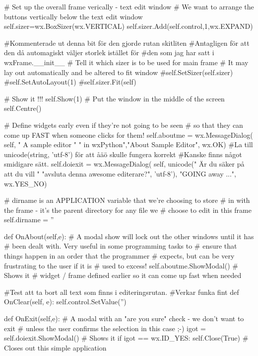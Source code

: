         # Set up the overall frame verically - text edit window
        # We want to arrange the buttons vertically below the text edit window
        self.sizer=wx.BoxSizer(wx.VERTICAL)
        self.sizer.Add(self.control,1,wx.EXPAND)

        #Kommenterade ut denna bit för den gjorde rutan skitliten
        #Antagligen för att den då automagiskt väljer storlek istället för
        #den som jag har satt i wxFrame.__init__
        # Tell it which sizer is to be used for main frame
        # It may lay out automatically and be altered to fit window
        #self.SetSizer(self.sizer)
        #self.SetAutoLayout(1)
        #self.sizer.Fit(self)

        # Show it !!!
        self.Show(1)
        # Put the window in the middle of the screen
        self.Centre()

        # Define widgets early even if they're not going to be seen
        # so that they can come up FAST when someone clicks for them!
        self.aboutme = wx.MessageDialog( self, " A sample editor \n"
                            " in wxPython","About Sample Editor", wx.OK)
        #La till unicode(string, 'utf-8') för att åäö skulle fungera korrekt
        #Kanske finns något smidigare sätt.
        self.doiexit = wx.MessageDialog( self, unicode(" Är du säker på att du vill \n"
                                         "avsluta denna awesome editerare?", 'utf-8'),
                        "GOING away ...", wx.YES_NO)

        # dirname is an APPLICATION variable that we're choosing to store
        # in with the frame - it's the parent directory for any file we
        # choose to edit in this frame
        self.dirname = ''

    def OnAbout(self,e):
        # A modal show will lock out the other windows until it has
        # been dealt with. Very useful in some programming tasks to
        # ensure that things happen in an order that  the programmer
        # expects, but can be very frustrating to the user if it is
        # used to excess!
        self.aboutme.ShowModal() # Shows it
        # widget / frame defined earlier so it can come up fast when needed

    #Test att ta bort all text som finns i editeringsrutan.
    #Verkar funka fint
    def OnClear(self, e):
        self.control.SetValue('')
        
    def OnExit(self,e):
        # A modal with an "are you sure" check - we don't want to exit
        # unless the user confirms the selection in this case ;-)
        igot = self.doiexit.ShowModal() # Shows it
        if igot == wx.ID_YES:
            self.Close(True)  # Closes out this simple application

